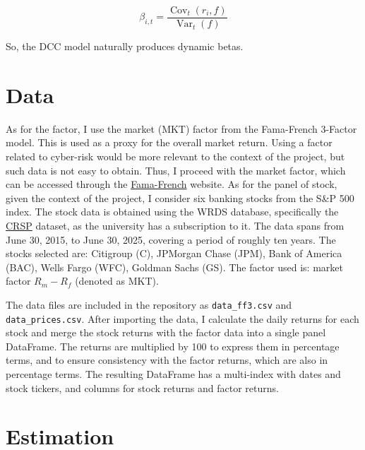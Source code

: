 \documentclass[10pt,parskip=half]{scrartcl}
\numberwithin{equation}{section} %
\numberwithin{figure}{section}   %
\numberwithin{table}{section}    %
\begin{document}
\[
\beta_{i,t} = \frac{\operatorname{Cov}_t(r_i,f)}{\operatorname{Var}_t(f)} \tag{3} \label{eq:time-varying-beta}
\]

So, the DCC model naturally produces dynamic betas.


\section{Data}
\vspace{-1em}

As for the factor, I use the market (MKT) factor from the Fama-French 3-Factor model.
This is used as a proxy for the overall market return.
Using a factor related to cyber-risk would be more relevant to the context of the project, but such data is not easy to obtain.
Thus, I proceed with the market factor, which can be accessed through the \href{https://mba.tuck.dartmouth.edu/pages/faculty/ken.french/Data_Library/f-f_factors.html}{Fama-French} website.
As for the panel of stock, given the context of the project, I consider six banking stocks from the S\&P 500 index.
The stock data is obtained using the WRDS database, specifically the \href{https://wrds-www.wharton.upenn.edu/pages/about/data-vendors/center-for-research-in-security-prices-crsp/\#products}{CRSP} dataset, as the university has a subscription to it.
The data spans from June 30, 2015, to June 30, 2025, covering a period of roughly ten years.
The stocks selected are: Citigroup (C), JPMorgan Chase (JPM), Bank of America (BAC), Wells Fargo (WFC), Goldman Sachs (GS).
The factor used is: market factor \(R_m - R_f\) (denoted as MKT).

The data files are included in the repository as \texttt{data\_ff3.csv} and \texttt{data\_prices.csv}.
After importing the data, I calculate the daily returns for each stock and merge the stock returns with the factor data into a single panel DataFrame.
The returns are multiplied by 100 to express them in percentage terms, and to ensure consistency with the factor returns, which are also in percentage terms.
The resulting DataFrame has a multi-index with dates and stock tickers, and columns for stock returns and factor returns.


\section{Estimation}
\vspace{-1em}
\end{document}
